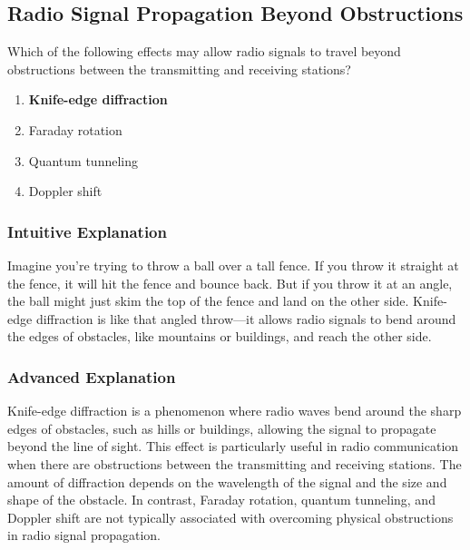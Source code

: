 \subsection{Radio Signal Propagation Beyond Obstructions}
\label{T3C05}

\begin{tcolorbox}[colback=gray!10!white,colframe=black!75!black,title=T3C05]
Which of the following effects may allow radio signals to travel beyond obstructions between the transmitting and receiving stations?
\begin{enumerate}[noitemsep]
    \item \textbf{Knife-edge diffraction}
    \item Faraday rotation
    \item Quantum tunneling
    \item Doppler shift
\end{enumerate}
\end{tcolorbox}

\subsubsection*{Intuitive Explanation}
Imagine you're trying to throw a ball over a tall fence. If you throw it straight at the fence, it will hit the fence and bounce back. But if you throw it at an angle, the ball might just skim the top of the fence and land on the other side. Knife-edge diffraction is like that angled throw—it allows radio signals to bend around the edges of obstacles, like mountains or buildings, and reach the other side.

\subsubsection*{Advanced Explanation}
Knife-edge diffraction is a phenomenon where radio waves bend around the sharp edges of obstacles, such as hills or buildings, allowing the signal to propagate beyond the line of sight. This effect is particularly useful in radio communication when there are obstructions between the transmitting and receiving stations. The amount of diffraction depends on the wavelength of the signal and the size and shape of the obstacle. In contrast, Faraday rotation, quantum tunneling, and Doppler shift are not typically associated with overcoming physical obstructions in radio signal propagation.

